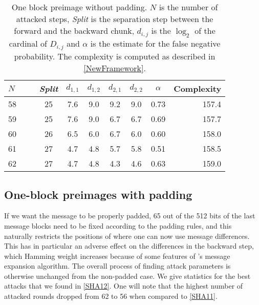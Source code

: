   \begin{table}[t]
    \caption[One block preimage without padding.]{One block preimage without padding. $N$ is the 
              number of attacked steps, \emph{Split} is the separation step between the
              forward and the backward chunk, $d_{i,j}$ is the $\log_2$ of the cardinal
              of $D_{i,j}$ and $\alpha$ is the estimate for the false negative probability. The complexity
              is computed as described in  \autoref{NewFramework}.\label{SHA11}}
    \begin{center}
      \begin{tabular}{l c c c c c c r @{}} \toprule
        $N\qquad$ &  \emph{Split} & $d_{1,1}$ &  $d_{1,2}$ & $d_{2,1}$ & $d_{2,2}$ & $\alpha $ & Complexity \\\midrule
        58    & 25  & 7.6  & 9.0 & 9.2 & 9.0 & 0.73  & 157.4\\ 
        59    & 25  & 7.6  & 9.0 & 6.7 & 6.7  & 0.69  & 157.7\\ 
        60    & 26  & 6.5 & 6.0 & 6.7 & 6.0  & 0.60  & 158.0\\ 
        61    & 27  & 4.7 & 4.8 & 5.7  & 5.8  & 0.51  & 158.5\\ 
        62    & 27  & 4.7 & 4.8 & 4.3  & 4.6  & 0.63 & 159.0 \\ 
        \bottomrule
        \hline
      \end{tabular}
    \end{center}
  \end{table}

  \subsection{One-block preimages with padding}
\label{sec:one_wi_pad}


  If we want the message to be properly padded, 65 out of the 512 bits of the last message
  blocks need to be fixed according to the padding rules, and this naturally restricts the positions
  of where one can now use message differences. This has in particular an adverse effect on
  the differences in the backward step, which Hamming weight increases because of some
  features of \shaone's message expansion algorithm. The overall process of finding attack
  parameters is otherwise unchanged from the non-padded case. We give statistics for
  the best attacks that we found in \autoref{SHA12}. One will note that the highest number of attacked
  rounds dropped from 62 to 56 when compared to \autoref{SHA11}.
 
